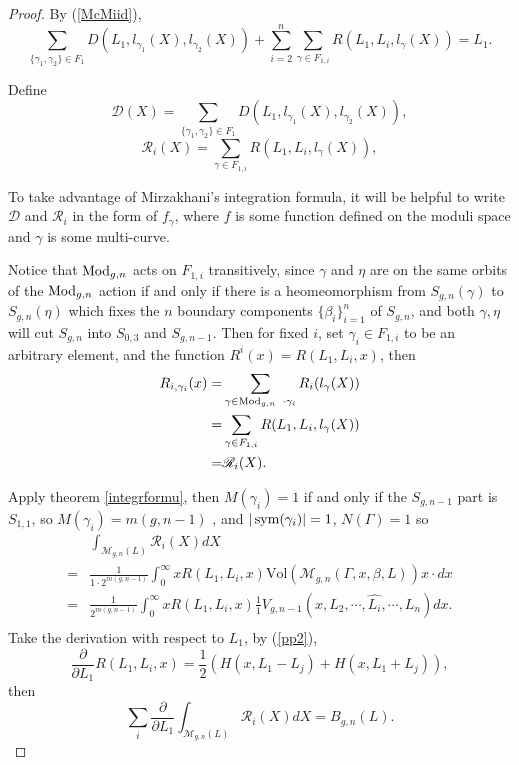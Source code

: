 \begin{proof}
By (\ref{McMiid}),  $$\sum_{\{\gamma_1,\gamma_2\}\in F_1}D(L_1,l_{\gamma_1} (X),l_{\gamma_2}(X))+\sum_{i=2}^n\sum_{\gamma\in  F_{1,i}}R(L_1,L_i,l_{\gamma}(X))=L_1.$$

Define $$
    \mathscr{D}(X)=\sum\limits_{\{\gamma_1,\gamma_2\}\in F_1}D(L_1,l_{\gamma_1} (X),l_{\gamma_2}(X)),
$$
 $$
    \mathscr{R}_i(X)=\sum_{\gamma\in  F_{1,i}}R(L_1,L_i,l_{\gamma}(X)),
$$


To take advantage of Mirzakhani's integration formula, it will be helpful to write $\mathscr{D}$ and $\mathscr{R}_i$ in the form of $f_\gamma$, where $f$ is some function defined on the moduli space and $\gamma$ is some multi-curve. 

Notice that $\operatorname{Mod}_{g,n}$ acts on $F_{1,i}$ transitively, since $\gamma$ and $\eta$ are on the same orbits of the $\operatorname{Mod}_{g,n}$  action if and only if there is a heomeomorphism from $S_{g,n}(\gamma)$ to $S_{g,n}(\eta)$ which fixes the $n$ boundary components $\{\beta_i\}_{i=1}^n$ of $S_{g,n}$, and both $\gamma,\eta$ will cut $S_{g,n}$ into $S_{0,3}$ and $S_{g,n-1}$. Then for fixed $i$,
set $\gamma_i\in F_{1,i}$ to be  an arbitrary element, and the function $R^i(x)=R(L_1,L_i,x)$, then $$
\begin{aligned}
R_{i,\gamma_i}(x)=&\sum_{\gamma\in \operatorname{Mod}_{g,n}\ \cdot \gamma_i}R_i(l_\gamma(X))\\
=&\sum_{\gamma\in F_{1,i}} R(L_1,L_i,l_{\gamma}(X))\\
=&\mathscr{R}_i(X).\\
\end{aligned}
$$

Apply theorem \ref{integrformu}, then $M(\gamma_i)=1$ if and only if the $S_{g,n-1}$ part is $S_{1,1}$, so $M(\gamma_i)=m(g,n-1)$ , and $|\operatorname{sym}(\gamma_i)|=1$, $N(\Gamma)=1$  so 
$$
\begin{aligned}
&\int_{\mathscr{M}_{g,n}(L)}\mathscr{R}_i(X)dX\\
=&\frac{1}{1\cdot 2^{m(g,n-1)}}\int_0^\infty xR(L_1,L_i,x)  \mathrm{Vol}(\mathscr{M}_{g,n}(\Gamma,x,\beta,L))x\cdot dx\\
=&\frac{1}{2^{m(g,n-1)}}\int_0^\infty xR(L_1,L_i,x)\frac{1}{1}V_{g,n-1}(x,L_2,\cdots,\hat{L_i},\cdots,L_n)dx.\\
\end{aligned}
$$
Take the derivation with respect to $L_1$, by (\ref{pp2}),
$$
\frac{\partial }{\partial L_1}R(L_1,L_i,x)=\frac{1}{2}(H(x,L_1-L_j)+H(x,L_1+L_j)),
$$
then \begin{equation}\label{partialL1}
    \sum_i\frac{\partial }{\partial L_1}\int_{\mathscr{M}_{g,n}(L)}\mathscr{R}_i(X)dX=B_{g,n}(L).
\end{equation}


\end{proof}

